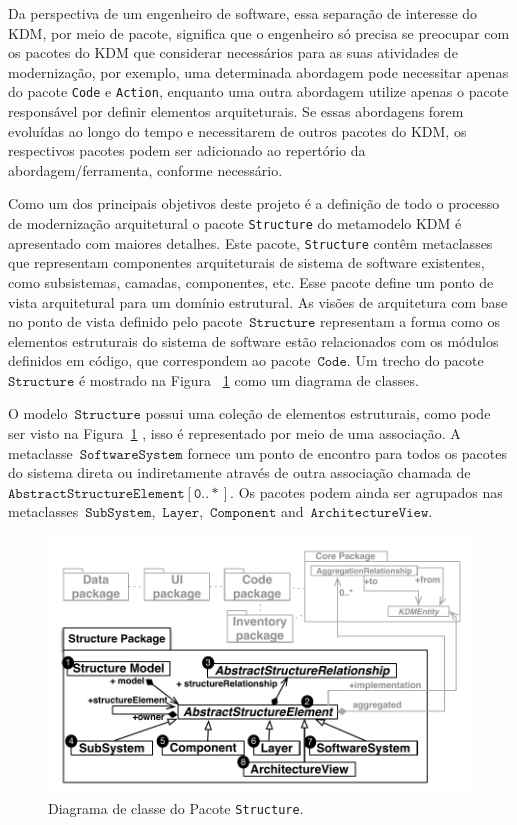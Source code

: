 \documentclass[12pt]{article}
\begin{document}
Da perspectiva de um engenheiro de software, essa separação de interesse do KDM, por meio de pacote, significa que o engenheiro só precisa se preocupar com os pacotes do KDM que considerar necessários para as suas atividades de modernização, por exemplo, uma determinada abordagem pode necessitar apenas do pacote \texttt{Code} e \texttt{Action}, enquanto uma outra abordagem utilize apenas o pacote responsável por definir elementos arquiteturais. Se essas abordagens forem evoluídas ao longo do tempo e necessitarem de outros pacotes do KDM, os respectivos pacotes podem ser adicionado ao repertório da abordagem/ferramenta, conforme necessário.

Como um dos principais objetivos deste projeto é a definição de todo o processo de modernização arquitetural o pacote \texttt{Structure} do metamodelo KDM é apresentado com maiores detalhes. Este pacote, \texttt{Structure} contêm metaclasses que representam componentes arquiteturais de sistema de software existentes, como subsistemas, camadas, componentes, etc. Esse pacote define um ponto de vista arquitetural para um domínio estrutural. As visões de arquitetura com base no ponto de vista definido pelo pacote~$\mathtt{Structure}$ representam a forma como os elementos estruturais do sistema de software estão relacionados com os módulos definidos em código, que correspondem ao pacote~$\mathtt{Code}$. Um trecho do pacote~$\mathtt{Structure}$ é mostrado na Figura ~\ref{fig:structureModel} como um diagrama de classes.

O modelo~$\mathtt{Structure}$ possui uma coleção de elementos estruturais, como pode ser visto na Figura~\ref{fig:structureModel} , isso é representado por meio de uma associação. A metaclasse~$\mathtt{SoftwareSystem}$ fornece um ponto de encontro para todos os pacotes do sistema direta ou indiretamente através de outra associação chamada de~$\mathtt{AbstractStructureElement[0..*]}$. Os pacotes podem ainda ser agrupados nas metaclasses~$\mathtt{SubSystem}$,~$\mathtt{Layer}$,~$\mathtt{Component}$ and~$\mathtt{ArchitectureView}$.

\begin{figure}[h]
 \centering
 \includegraphics[scale=0.8]{StructurePackageFigure.pdf}
 \caption{Diagrama de classe do Pacote \texttt{Structure}.}
 \label{fig:structureModel}
\end{figure}
\end{document}

